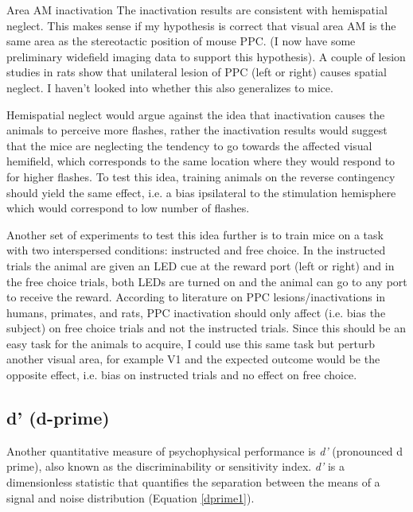 Area AM inactivation
The inactivation results are consistent with hemispatial neglect. This makes sense if my hypothesis is correct that visual area AM is the same area as the stereotactic position of mouse PPC. (I now have some preliminary widefield imaging data to support this hypothesis). A couple of lesion studies in rats show that unilateral lesion of PPC (left or right) causes spatial neglect.  I haven’t looked into whether this also generalizes to mice.

Hemispatial neglect would argue against the idea that inactivation causes the animals to perceive more flashes, rather the inactivation results would suggest that the mice are neglecting the tendency to go towards the affected visual hemifield, which corresponds to the same location where they would respond to for higher flashes. To test this idea, training animals on the reverse contingency should yield the same effect, i.e. a bias ipsilateral to the stimulation hemisphere which would correspond to low number of flashes.

Another set of experiments to test this idea further is to train mice on a task with two interspersed conditions: instructed and free choice. In the instructed trials the animal are given an LED cue at the reward port (left or right) and in the free choice trials, both LEDs are turned on and the animal can go to any port to receive the reward. According to literature on PPC lesions/inactivations in humans, primates, and rats, PPC inactivation should only affect (i.e. bias the subject) on free choice trials and not the instructed trials. Since this should be an easy task for the animals to acquire, I could use this same task but perturb another visual area, for example V1 and the expected outcome would be the opposite effect, i.e. bias on instructed trials and no effect on free choice.

\subsection{d' (d-prime)}
Another quantitative measure of psychophysical performance is \emph{d'} (pronounced d prime), also known as the discriminability or sensitivity index. \emph{d'} is a dimensionless statistic that quantifies the separation between the means of a signal and noise distribution \parencite{Macmillian,Green1989SignalPsychophysics} (Equation \ref{dprime1}). 

